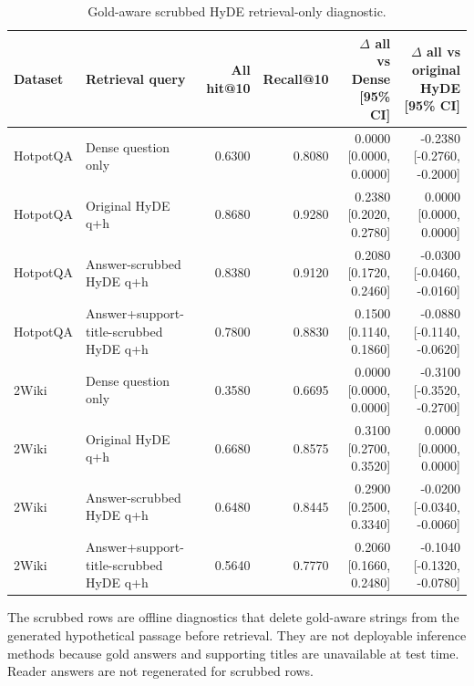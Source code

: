 \begin{table}[t]
\centering
\caption{Gold-aware scrubbed HyDE retrieval-only diagnostic.}
\label{tab:hyde_gold_content_scrubbed}
\scriptsize
\begin{threeparttable}
\setlength{\tabcolsep}{4pt}
\begin{tabularx}{\textwidth}{>{\raggedright\arraybackslash}p{} >{\raggedright\arraybackslash}X r r r r}
\toprule
Dataset & Retrieval query & All hit@10 & Recall@10 & $\Delta$ all vs Dense [95\% CI] & $\Delta$ all vs original HyDE [95\% CI] \\
\midrule
HotpotQA & Dense question only & 0.6300 & 0.8080 & 0.0000 [0.0000, 0.0000] & -0.2380 [-0.2760, -0.2000] \\
HotpotQA & Original HyDE q+h & 0.8680 & 0.9280 & 0.2380 [0.2020, 0.2780] & 0.0000 [0.0000, 0.0000] \\
HotpotQA & Answer-scrubbed HyDE q+h & 0.8380 & 0.9120 & 0.2080 [0.1720, 0.2460] & -0.0300 [-0.0460, -0.0160] \\
HotpotQA & Answer+support-title-scrubbed HyDE q+h & 0.7800 & 0.8830 & 0.1500 [0.1140, 0.1860] & -0.0880 [-0.1140, -0.0620] \\
2Wiki & Dense question only & 0.3580 & 0.6695 & 0.0000 [0.0000, 0.0000] & -0.3100 [-0.3520, -0.2700] \\
2Wiki & Original HyDE q+h & 0.6680 & 0.8575 & 0.3100 [0.2700, 0.3520] & 0.0000 [0.0000, 0.0000] \\
2Wiki & Answer-scrubbed HyDE q+h & 0.6480 & 0.8445 & 0.2900 [0.2500, 0.3340] & -0.0200 [-0.0340, -0.0060] \\
2Wiki & Answer+support-title-scrubbed HyDE q+h & 0.5640 & 0.7770 & 0.2060 [0.1660, 0.2480] & -0.1040 [-0.1320, -0.0780] \\
\bottomrule
\end{tabularx}
\begin{tablenotes}
\footnotesize
\item The scrubbed rows are offline diagnostics that delete gold-aware strings from the generated hypothetical passage before retrieval. They are not deployable inference methods because gold answers and supporting titles are unavailable at test time. Reader answers are not regenerated for scrubbed rows.
\end{tablenotes}
\end{threeparttable}
\end{table}
